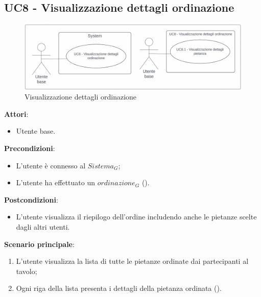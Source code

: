 \subsection{UC8 - Visualizzazione dettagli ordinazione}\label{usecase:8}
\begin{figure}[H]
    \centering
    \includegraphics[width=0.9\linewidth]{ucd/ucd8_new.png}
    \caption{Visualizzazione dettagli ordinazione}
\end{figure}
\textbf{Attori}:
\begin{itemize}
    \item Utente base.
\end{itemize}
\textbf{Precondizioni}:
\begin{itemize}
    \item L'utente è connesso al $\textit{Sistema}_G$;
    \item L'utente ha effettuato un $\textit{ordinazione}_G$ ().
\end{itemize}
\textbf{Postcondizioni}:
\begin{itemize}
    \item L'utente visualizza il riepilogo dell'ordine includendo anche le pietanze scelte dagli altri utenti.
\end{itemize}
\textbf{Scenario principale}:
\begin{enumerate}
    \item L'utente visualizza la lista di tutte le pietanze ordinate dai partecipanti al tavolo;
    \item Ogni riga della lista presenta i dettagli della pietanza ordinata ().
\end{enumerate}
